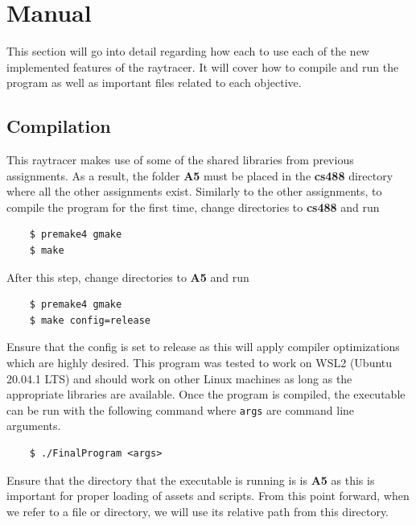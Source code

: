 \documentclass {article}
\begin{document}
\section{Manual}
This section will go into detail regarding how each to use each of the new implemented 
features of the raytracer. It will cover how to compile and run the program as well
as important files related to each objective.
\subsection{Compilation}
This raytracer makes use of some of the shared libraries from previous assignments. As a result, 
the folder \textbf{A5} must be placed in the \textbf{cs488} directory where all the other assignments
exist. Similarly to the other assignments, to compile the program for the first time, change directories
to \textbf{cs488} and run 
\begin{verbatim}
    $ premake4 gmake
    $ make
\end{verbatim}
After this step,
change directories to \textbf{A5} and run
\begin{verbatim}
    $ premake4 gmake
    $ make config=release
\end{verbatim}
Ensure that the config is set to release as this will apply compiler optimizations which are highly desired.
This program was tested to work on WSL2 (Ubuntu 20.04.1 LTS) and should work on other
Linux machines as long as the appropriate libraries
are available. Once the program is compiled, the executable can be run with the following command where
\texttt{args} are command line arguments.
\begin{verbatim}
    $ ./FinalProgram <args>
\end{verbatim}
Ensure that the directory that the executable is running is is \textbf{A5} as this is important for proper
loading of assets and scripts. From this point forward, when we refer to a file or directory, we will
use its relative path from this directory.
\end{document}
